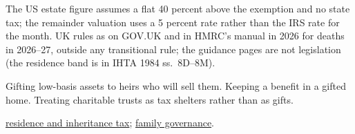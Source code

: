 \begin{qfmethod}
 The US estate figure assumes a flat 40 percent above the exemption and no state tax; the remainder valuation uses a 5 percent rate rather than the IRS rate for the month. UK rules as on GOV.UK and in HMRC's manual in 2026 for deaths in 2026--27, outside any transitional rule; the guidance pages are not legislation (the residence band is in IHTA 1984 ss.~8D--8M).

 Gifting low-basis assets to heirs who will sell them. Keeping a benefit in a gifted home. Treating charitable trusts as tax shelters rather than as gifts.

 \hyperref[meth:residency-citizenship]{residence and inheritance tax}; \hyperref[meth:advising-families]{family governance}.

\end{qfmethod}
